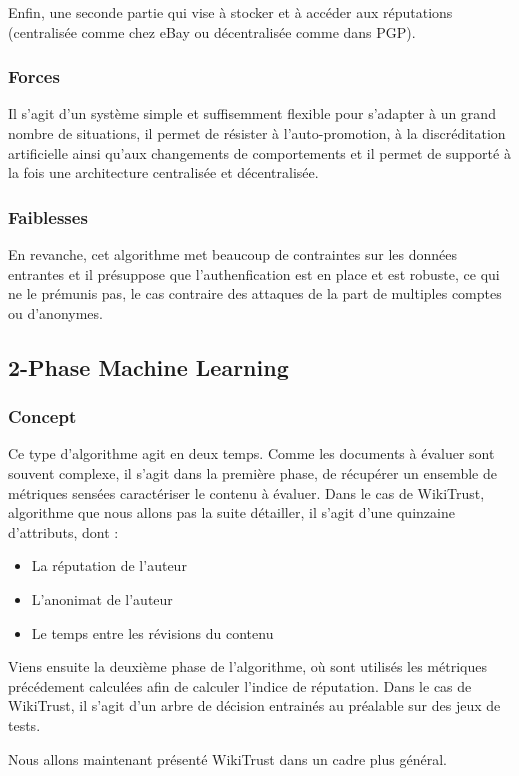 \documentclass[a4paper, 11pt]{article} %
\begin{document}
Enfin, une seconde partie qui vise à stocker et à accéder aux réputations (centralisée comme chez eBay ou décentralisée comme dans PGP).

\subsubsection{Forces}
Il s'agit d'un système simple et suffisemment flexible pour s'adapter à un grand nombre de situations, il permet de résister à l'auto-promotion, à la discréditation artificielle ainsi qu'aux changements de comportements et il permet de supporté à la fois une architecture centralisée et décentralisée.

\subsubsection{Faiblesses}
En revanche, cet algorithme met beaucoup de contraintes sur les données entrantes et il présuppose que l'authenfication est en place et est robuste, ce qui ne le prémunis pas, le cas contraire des attaques de la part de multiples comptes ou d'anonymes.

\subsection{2-Phase Machine Learning}
\subsubsection{Concept}
Ce type d'algorithme agit en deux temps.
Comme les documents à évaluer sont souvent complexe, il s'agit dans la première phase, de récupérer un ensemble de métriques sensées caractériser le contenu à évaluer.
Dans le cas de WikiTrust, algorithme que nous allons pas la suite détailler, il s'agit d'une quinzaine d'attributs, dont :
\begin{itemize}
	\item La réputation de l'auteur
	\item L'anonimat de l'auteur
	\item Le temps entre les révisions du contenu
\end{itemize}
Viens ensuite la deuxième phase de l'algorithme, où sont utilisés les métriques précédement calculées afin de calculer l'indice de réputation.
Dans le cas de WikiTrust, il s'agit d'un arbre de décision entrainés au préalable sur des jeux de tests.

Nous allons maintenant présenté WikiTrust dans un cadre plus général.
\end{document}
